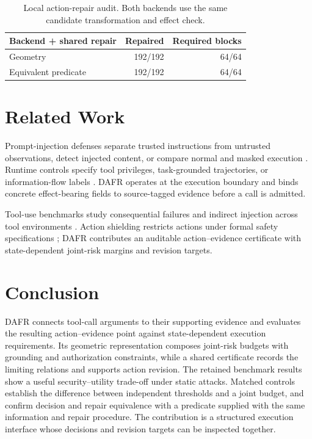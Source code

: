 \documentclass[11pt]{article}
\begin{document}
\begin{table}[t]
\centering
\scriptsize
\begin{tabular}{lrr}
\toprule
Backend + shared repair & Repaired & Required blocks\\
\midrule
Geometry & 192/192 & 64/64\\
Equivalent predicate & 192/192 & 64/64\\
\bottomrule
\end{tabular}
\caption{Local action-repair audit. Both backends use the same candidate transformation and effect check.}
\label{tab:repair-interface}
\end{table}

\section{Related Work}

Prompt-injection defenses separate trusted instructions from untrusted observations, detect injected content, or compare normal and masked execution \citep{greshake2023indirectpromptinjection,hines2024spotlighting,wallace2024instructionhierarchy,li2025piguard,jia2025taskshield,zhu2025melon}. Runtime controls specify tool privileges, task-grounded trajectories, or information-flow labels \citep{wang2025agentspec,shi2025progent,NEURIPS2025_77f3b26c,debenedetti2025defeatingpromptinjectionsdesign,costa2025fides}. DAFR operates at the execution boundary and binds concrete effect-bearing fields to source-tagged evidence before a call is admitted.

Tool-use benchmarks study consequential failures and indirect injection across tool environments \citep{ruan2024toolemu,ye2024toolsword,NEURIPS2024_97091a51,zhang2025agentsecuritybench,andriushchenko2025agentharm,wang2026mcptox}. Action shielding restricts actions under formal safety specifications \citep{alshiekh2018shielding}; DAFR contributes an auditable action--evidence certificate with state-dependent joint-risk margins and revision targets.

\section{Conclusion}

DAFR connects tool-call arguments to their supporting evidence and evaluates the resulting action--evidence point against state-dependent execution requirements. Its geometric representation composes joint-risk budgets with grounding and authorization constraints, while a shared certificate records the limiting relations and supports action revision. The retained benchmark results show a useful security--utility trade-off under static attacks. Matched controls establish the difference between independent thresholds and a joint budget, and confirm decision and repair equivalence with a predicate supplied with the same information and repair procedure. The contribution is a structured execution interface whose decisions and revision targets can be inspected together.
\end{document}
